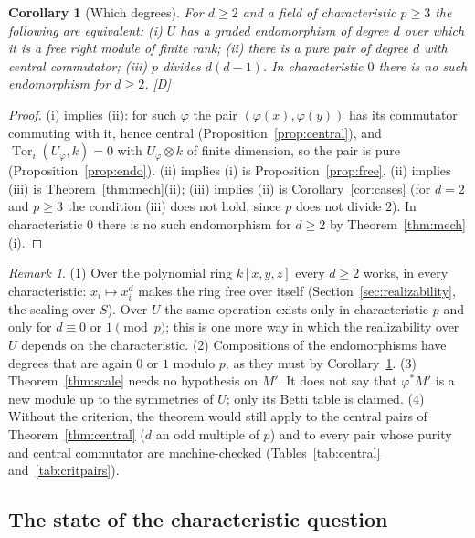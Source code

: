 \documentclass[11pt]{article}
\newtheorem{corollary}{Corollary}
\theoremstyle{definition}
\theoremstyle{remark}
\newtheorem{remark}{Remark}
\newcommand{\Tor}{\operatorname{Tor}}
\begin{document}
\begin{corollary}[Which degrees]\label{cor:scale3}
For $d\ge2$ and a field of characteristic $p\ge3$ the following are equivalent: (i) $U$ has a graded endomorphism of degree $d$ over which it is a free right module of finite rank; (ii) there is a pure pair of degree $d$ with central commutator; (iii) $p$ divides $d(d-1)$. In characteristic $0$ there is no such endomorphism for $d\ge2$. [D]
\end{corollary}
\begin{proof}
(i) implies (ii): for such $\varphi$ the pair $(\varphi(x),\varphi(y))$ has its commutator commuting with it, hence central (Proposition~\ref{prop:central}), and $\Tor_i(U_\varphi,k)=0$ with $U_\varphi\otimes k$ of finite dimension, so the pair is pure (Proposition~\ref{prop:endo}). (ii) implies (i) is Proposition~\ref{prop:free}. (ii) implies (iii) is Theorem~\ref{thm:mech}(ii); (iii) implies (ii) is Corollary~\ref{cor:cases} (for $d=2$ and $p\ge3$ the condition (iii) does not hold, since $p$ does not divide $2$). In characteristic $0$ there is no such endomorphism for $d\ge2$ by Theorem~\ref{thm:mech}(i).
\end{proof}

\begin{remark}\label{rem:scale}
(1) Over the polynomial ring $k[x,y,z]$ every $d\ge2$ works, in every characteristic: $x_i\mapsto x_i^d$ makes the ring free over itself (Section~\ref{sec:realizability}, the scaling over $S$). Over $U$ the same operation exists only in characteristic $p$ and only for $d\equiv0$ or $1\pmod p$; this is one more way in which the realizability over $U$ depends on the characteristic. (2) Compositions of the endomorphisms have degrees that are again $0$ or $1$ modulo $p$, as they must by Corollary~\ref{cor:scale3}. (3) Theorem~\ref{thm:scale} needs no hypothesis on $M'$. It does not say that $\varphi^*M'$ is a new module up to the symmetries of $U$; only its Betti table is claimed. (4) Without the criterion, the theorem would still apply to the central pairs of Theorem~\ref{thm:central} ($d$ an odd multiple of $p$) and to every pair whose purity and central commutator are machine-checked (Tables~\ref{tab:central} and~\ref{tab:critpairs}).
\end{remark}

\subsection{The state of the characteristic question}
\label{sec:state}
\end{document}
